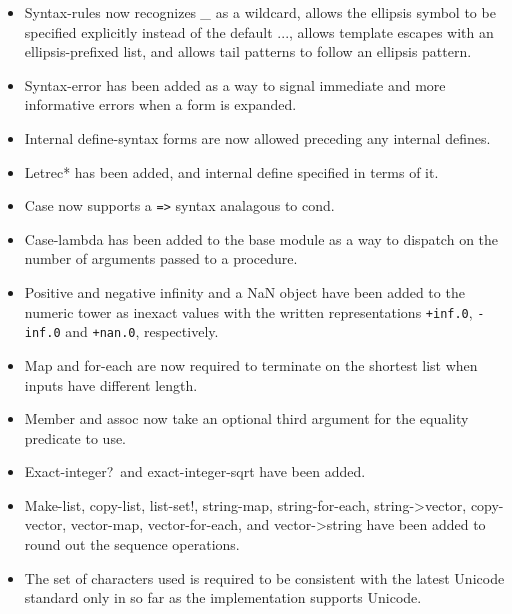 \begin{itemize}
\item {\cf Syntax-rules} now recognizes {\em \_} as a wildcard, allows
the ellipsis symbol to be specified explicitly instead of the default
{\cf ...}, allows template escapes with an ellipsis-prefixed list, and
allows tail patterns to follow an ellipsis pattern.

\item {\cf Syntax-error} has been added as a way to signal immediate
and more informative errors when a form is expanded.

\item Internal {\cf define-syntax} forms are now allowed preceding any
internal {\cf define}s.

\item {\cf Letrec*} has been added, and internal define specified in
terms of it.

\item {\cf Case} now supports a {\tt =>} syntax analagous to {\cf cond}.

\item {\cf Case-lambda} has been added to the base module as a way to
dispatch on the number of arguments passed to a procedure.

\item Positive and negative infinity and a NaN object have been added
to the numeric tower as inexact values with the written
representations {\tt +inf.0}, {\tt -inf.0} and {\tt +nan.0},
respectively.

\item {\cf Map} and {\cf for-each} are now required to terminate on
the shortest list when inputs have different length.

\item {\cf Member} and {\cf assoc} now take an optional third argument
for the equality predicate to use.

\item {\cf Exact-integer?}\  and {\cf exact-integer-sqrt} have been added.

\item {\cf Make-list}, {\cf copy-list}, {\cf list-set!}, {\cf
string-map}, {\cf string-for-each}, {\cf string->vector}, {\cf
copy-vector}, {\cf vector-map}, {\cf vector-for-each}, and {\cf
vector->string} have been added to round out the sequence operations.

\item The set of characters used is required to be consistent with the
latest Unicode standard only in so far as the implementation supports
Unicode.


\end{itemize}

